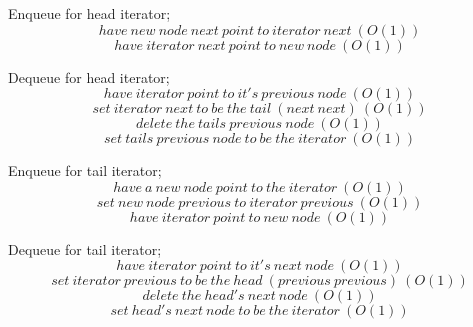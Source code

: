 \documentclass[journal]{IEEEtran}
\begin{document}
Enqueue for head iterator;
\begin{equation}
    have~new~node~next~point~to~iterator~next~(O(1))
\end{equation} 
\begin{equation}
    have~iterator~next~point~to~new~node~(O(1))
\end{equation} 

Dequeue for head iterator;
\begin{equation}
    have~iterator~point~to~it's~previous~node~(O(1))
\end{equation}
\begin{equation}
    set~iterator~next~to~be~the~tail~(next~next)~(O(1))
\end{equation} 
\begin{equation}
    delete~the~tails~previous~node~(O(1))
\end{equation} 
\begin{equation}
    set~tails~previous~node~to~be~the~iterator~(O(1))
\end{equation} 


Enqueue for tail iterator;
\begin{equation}
    have~a~new~node~point~to~the~iterator~(O(1))
\end{equation} 
\begin{equation}
    set~new~node~previous~to~iterator~previous~(O(1))
\end{equation} 
\begin{equation}
    have~iterator~point~to~new~node~(O(1))
\end{equation} 

Dequeue for tail iterator;
\begin{equation}
    have~iterator~point~to~it's~next~node~(O(1)) 
\end{equation}
\begin{equation}
    set~iterator~previous~to~be~the~head~(previous~previous)~(O(1))
\end{equation} 
\begin{equation}
    delete~the~head's~next~node~(O(1))
\end{equation} 
\begin{equation}
    set~head's~next~node~to~be~the~iterator~(O(1))
\end{equation} 
\end{document}
